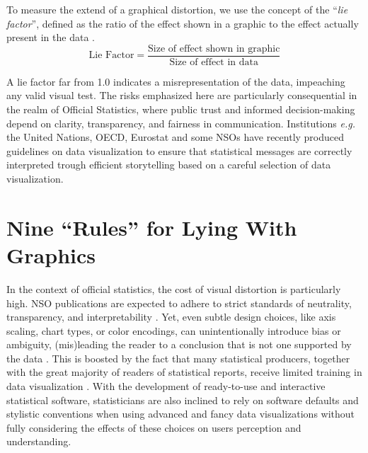 \documentclass[11pt,twoside,a4paper]{article}
\begin{document}
 To measure the extend of a graphical distortion, we use the concept of the “\emph{lie factor}”, defined  as the ratio of the effect shown in a graphic to the effect actually present in the data \citep{Tufte2001}.
 \begin{equation}
 \nonumber
\text{Lie Factor} = \frac{\text{Size of effect shown in graphic}}{\text{Size of effect in data}}
\end{equation}

 A lie factor far from 1.0 indicates a misrepresentation of the data, impeaching any valid visual test.  The risks emphasized here are particularly consequential in the realm of Official Statistics, where public trust and informed decision-making depend on clarity, transparency, and fairness in communication. Institutions \textit{e.g.} the United Nations, OECD, Eurostat  \citep{UNSD2024StoryTelling, OECD2017, Eurostat2022} and some NSOs \citep{ONS2020} have recently produced guidelines on data visualization to ensure that statistical messages are correctly interpreted trough efficient storytelling based on a  careful selection of data visualization.


\section{Nine ``Rules'' for Lying With Graphics}

In the context of official statistics, the cost of visual distortion is particularly high. NSO publications are expected to adhere to strict standards of neutrality, transparency, and interpretability \citep{FPOS1994}. Yet, even subtle design choices, like axis scaling, chart types, or color encodings, can unintentionally introduce bias or ambiguity, (mis)leading the reader to a conclusion that is not one supported by the data  \citep{Cairo2019}. This is boosted by the fact that many statistical producers, together with  the great majority of readers of statistical reports, receive limited training in data visualization \citep{Radermacher2021Literacy, damouras2021}. With the development of ready-to-use  and interactive statistical software, statisticians are also inclined to rely on software defaults and stylistic conventions when using advanced and fancy data visualizations without fully considering the effects of these choices on users perception and understanding.
\end{document}
